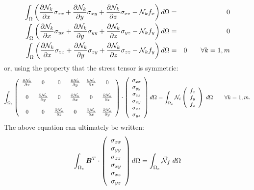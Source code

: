 \begin{eqnarray}
\int_\Omega
\left(
\frac{\partial {{\mathcal{N}}}_k}{\partial x} \sigma_{xx} +
\frac{\partial {{\mathcal{N}}}_k}{\partial y} \sigma_{xy} +
\frac{\partial {{\mathcal{N}}}_k}{\partial z} \sigma_{xz} - {{\mathcal{N}}}_k  f_x \right) d\Omega &=&0 \nonumber\\ 
\int_\Omega
\left(
\frac{\partial {{\mathcal{N}}}_k}{\partial x} \sigma_{yx} +
\frac{\partial {{\mathcal{N}}}_k}{\partial y} \sigma_{yy} +
\frac{\partial {{\mathcal{N}}}_k}{\partial z} \sigma_{yz} - {{\mathcal{N}}}_k  f_y \right) d\Omega &=&0 \nonumber\\ 
\int_\Omega
\left(
\frac{\partial {{\mathcal{N}}}_k}{\partial x} \sigma_{zx} +
\frac{\partial {{\mathcal{N}}}_k}{\partial y} \sigma_{zy} +
\frac{\partial {{\mathcal{N}}}_k}{\partial z} \sigma_{zz} - {{\mathcal{N}}}_k  f_y \right) d\Omega &=&0 
\qquad
\forall k=1,m 
\end{eqnarray}
or, using the property that the stress tensor is symmetric:
\begin{equation}
\int_{\Omega_e} 
\left(
\begin{array}{cccccc}
\frac{\partial {\mathcal{N}}_k}{\partial x} & 0 & 0& 
\frac{\partial {\mathcal{N}}_k}{\partial y} & 
\frac{\partial {\mathcal{N}}_k}{\partial z} & 0\\  \\
0 & \frac{\partial {\mathcal{N}}_k}{\partial y} & 0  & 
\frac{\partial {\mathcal{N}}_k}{\partial x}  & 0 &
\frac{\partial {\mathcal{N}}_k}{\partial z}  \\ \\
0 & 0 & \frac{\partial {\mathcal{N}}_k}{\partial z} &  0 & 
\frac{\partial {\mathcal{N}}_k}{\partial x} &  
\frac{\partial {\mathcal{N}}_k}{\partial y} 
\end{array}
\right)
\cdot
\left(
\begin{array}{c}
\sigma_{xx}\\
\sigma_{yy}\\
\sigma_{zz}\\
\sigma_{xy}\\
\sigma_{xz}\\
\sigma_{yz}\\
\end{array}
\right)
d\Omega = \int_{\Omega_e} {\mathcal{N}}_i 
\left(\begin{array}{c}
f_x \\ f_y \\ f_z
\end{array}\right)
\; d\Omega
\qquad
\forall k=1,m. 
\end{equation}
The above equation can ultimately be written:
\begin{equation}
\int_{\Omega_e} {\bm B}^T \cdot 
\left(
\begin{array}{c}
\sigma_{xx}\\
\sigma_{yy}\\
\sigma_{zz}\\
\sigma_{xy}\\
\sigma_{xz}\\
\sigma_{yz}
\end{array}
\right)
d\Omega
=
\int_{\Omega_e} {\vec {{\mathcal{N}}}}_f\; d\Omega
\label{eq:elfem1}
\end{equation}
